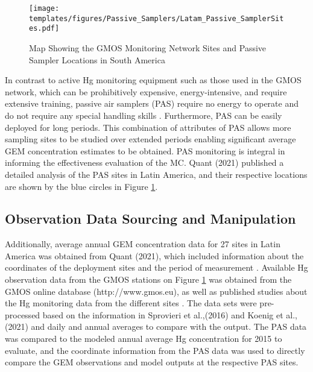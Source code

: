 \begin{figure}[H]
 \centering
  \texttt{[image: templates/figures/Passive\_Samplers/Latam\_Passive\_SamplerSites.pdf]}
  \caption{Map Showing the GMOS Monitoring Network Sites and Passive Sampler Locations in South America \cite{quant_measuring_2021,koenig_seasonal_2021}}
  \label{fig:Latam_Passive_SamplerSites}
\end{figure}
\FloatBarrier

\begin{flushleft}
    In contrast to active Hg monitoring equipment such as those used in the GMOS network, which can be prohibitively expensive, energy-intensive, and require extensive training, passive air samplers (PAS) require no energy to operate and do not require any special handling skills \cite{quant_measuring_2021}. Furthermore, PAS can be easily deployed for long periods. This combination of attributes of PAS allows more sampling sites to be studied over extended periods enabling significant average GEM concentration estimates to be obtained. PAS monitoring is integral in informing the effectiveness evaluation of the MC\cite{gustin_measuring_2015,unep_guidance_2021}. Quant (2021) published a detailed analysis of the PAS sites in Latin America, and their respective locations are shown by the blue circles in Figure \ref{fig:Latam_Passive_SamplerSites}. 
\end{flushleft}

\subsection{Observation Data Sourcing and Manipulation}
\begin{flushleft}
  Additionally, average annual GEM concentration data for 27 sites in Latin America was obtained from Quant (2021), which included information about the coordinates of the deployment sites and the period of measurement \cite{quant_measuring_2021}. Available Hg observation data from the GMOS stations on Figure  \ref{fig:Latam_Passive_SamplerSites} was obtained from the GMOS online database (http://www.gmos.eu), as well as published studies about the Hg monitoring data from the different sites  \cite{koenig_seasonal_2021}. The data sets were pre-processed based on the information in Sprovieri et al.,(2016) and Koenig et al.,(2021) and daily and annual averages to compare with the \gc output\cite{koenig_seasonal_2021,sprovieri_atmospheric_2016}. The PAS data was compared to the modeled annual average Hg concentration for 2015 to evaluate, and the coordinate information from the PAS data was used to directly compare the GEM observations and model outputs at the respective PAS sites.
\end{flushleft}





